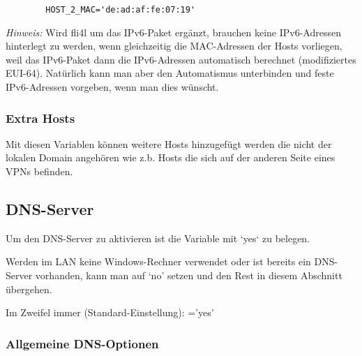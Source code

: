 \begin{description}
{\begin{example}
\begin{verbatim}
        HOST_2_MAC='de:ad:af:fe:07:19'
\end{verbatim}
\end{example}

      \emph{Hinweis:} Wird fli4l um das IPv6-Paket ergänzt, brauchen keine
      IPv6-Adressen hinterlegt zu werden, wenn gleichzeitig die MAC-Adressen
      der Hosts vorliegen, weil das IPv6-Paket dann die IPv6-Adressen
      automatisch berechnet (modifiziertes EUI-64). Natürlich kann man aber
      den Automatismus unterbinden und feste IPv6-Adressen vorgeben, wenn man
      dies wünscht.
      }


\end{description}

\subsubsection{Extra Hosts}
  \begin{description}
  {
      Mit diesen Variablen können weitere Hosts hinzugefügt werden die nicht der
      lokalen Domain angehören wie z.b. Hosts die sich auf der anderen Seite eines
      VPNs befinden.
  
  }  
\end{description}


\subsection{DNS-Server}
  \begin{description}

    {Um den DNS-Server zu aktivieren ist die Variable 
    mit `yes` zu belegen.

    Werden im LAN keine Windows-Rechner verwendet oder ist bereits
      ein DNS-Server vorhanden, kann man  auf `no' setzen
      und den Rest in diesem Abschnitt übergehen.

      Im Zweifel immer (Standard-Einstellung): ='yes'}

\end{description}
\subsubsection{Allgemeine DNS-Optionen}

